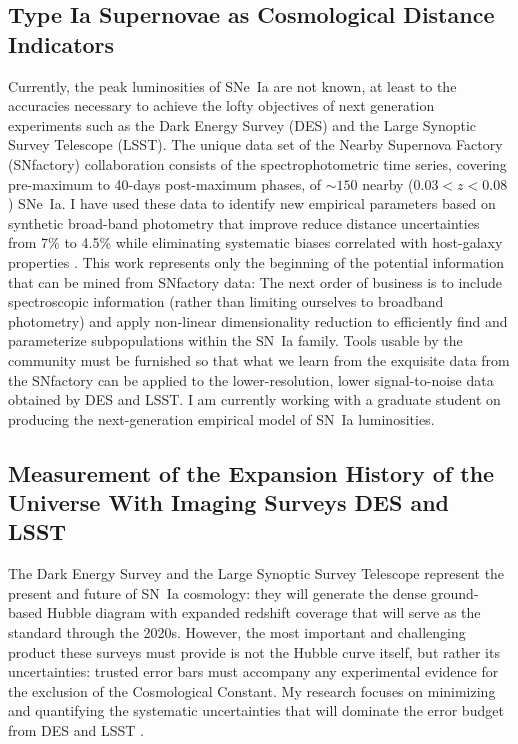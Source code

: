 \documentclass{article}
\begin{document}
\subsection{Type Ia Supernovae as Cosmological Distance Indicators}
Currently, the peak luminosities of SNe~Ia are not known, at least to the accuracies necessary
to achieve the lofty objectives of next generation experiments such as the Dark Energy Survey (DES) and the Large Synoptic
Survey Telescope (LSST).  The unique data set of
the Nearby Supernova Factory (SNfactory) collaboration consists of the spectrophotometric
time series, covering pre-maximum to 40-days post-maximum phases,
of  $\sim 150$ nearby ($0.03<z<0.08$) SNe~Ia.
I have used these data  to identify new
empirical
parameters based on synthetic broad-band photometry that improve reduce distance uncertainties from 7\% to 4.5\% \cite{2013ApJ...766...84K}
while eliminating systematic biases correlated with host-galaxy
properties \cite{2014ApJ...784...51K}.  This work represents only the beginning of the
potential information that can be mined from  SNfactory data: The next order of business
is to include spectroscopic information (rather than limiting ourselves to broadband photometry)
and apply non-linear dimensionality reduction to efficiently find and parameterize
subpopulations   within the SN~Ia family.  Tools usable by the community must be furnished
so that what we learn from the
exquisite data from the SNfactory can be applied to the lower-resolution, lower signal-to-noise data obtained
by DES and LSST.  I am currently working with a graduate student on producing the next-generation empirical
model of SN~Ia luminosities.

\subsection{Measurement of the Expansion History of the Universe With Imaging Surveys  DES and LSST}
The Dark Energy Survey and the Large Synoptic Survey Telescope represent the present and future of
SN~Ia cosmology: they
will generate the dense ground-based Hubble diagram with expanded redshift coverage that will serve as the standard 
through the 2020s.  However,
the most important and challenging product these surveys must provide is not the Hubble curve itself,
but rather its uncertainties: trusted error bars must accompany any experimental evidence for the exclusion
of the Cosmological
Constant. My research focuses on
minimizing and quantifying the
systematic uncertainties that will dominate the error budget from DES and LSST \cite{2004MNRAS.347..909K}.  
\end{document}
